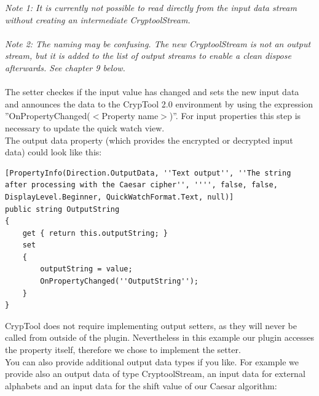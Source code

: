 \textit{\small Note 1: It is currently not possible to read directly from the input data stream without creating an intermediate CryptoolStream.\\\\
\small Note 2: The naming may be confusing. The new CryptoolStream is not an output stream, but it is added to the list of output streams to enable a clean dispose afterwards. See chapter 9 below.\\\\}
The setter checkes if the input value has changed and sets the new input data and announces the data to the CrypTool 2.0 environment by using the expression ''OnPropertyChanged($<$Property name$>$)''. For input properties this step is necessary to update the quick watch view.\\
The output data property (which provides the encrypted or decrypted input data) could look like this:
\begin{lstlisting}
[PropertyInfo(Direction.OutputData, ''Text output'', ''The string after processing with the Caesar cipher'', '''', false, false, DisplayLevel.Beginner, QuickWatchFormat.Text, null)]
public string OutputString
{
	get { return this.outputString; }
	set
	{
		outputString = value;
		OnPropertyChanged(''OutputString'');
	}
}
\end{lstlisting}
CrypTool does not require implementing output setters, as they will never be called from outside of the plugin. Nevertheless in this example our plugin accesses the property itself, therefore we chose to implement the setter.\\
You can also provide additional output data types if you like. For example we provide also an output data of type CryptoolStream, an input data for external alphabets and an input data for the shift value of our Caesar algorithm:
